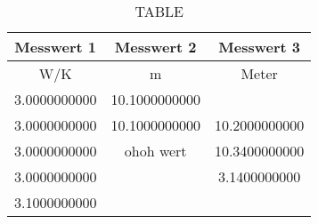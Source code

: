 \begin{table}
	\caption{TABLE}
	\label{tab:NAME}
	\begin{tabular}{S S S}
		\toprule
		{Messwert 1}         & 		{Messwert 2}         & 		{Messwert 3}          \\
		\midrule
		{W/K}                & 		{m}                  & 		{Meter}               \\
		3.0000000000         & 		10.1000000000        & 		{}                    \\
		3.0000000000         & 		10.1000000000        & 		10.2000000000         \\
		3.0000000000         & 		{ohoh wert}          & 		10.3400000000         \\
		3.0000000000         & 		{}                   & 		3.1400000000          \\
		3.1000000000         & 		{}                   & 		{}                    \\
		\bottomrule
	\end{tabular}
\end{table}